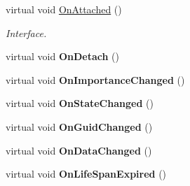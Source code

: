 \begin{DoxyCompactItemize}
virtual void \hyperlink{class_i_thing_afc3be625c06f223c51d76ecc93d91811}{On\+Attached} ()
\begin{DoxyCompactList}\small\item\em Interface. \end{DoxyCompactList}\item 
\mbox{\label{class_i_thing_a9dcb0efb7bf085ad0eac865e2e49d46c}} 
virtual void {\bfseries On\+Detach} ()
\item 
\mbox{\label{class_i_thing_a543632e1e628c81071a47904e80ae842}} 
virtual void {\bfseries On\+Importance\+Changed} ()
\item 
\mbox{\label{class_i_thing_a6a50ab4191f986cb614187bc4094375d}} 
virtual void {\bfseries On\+State\+Changed} ()
\item 
\mbox{\label{class_i_thing_af60bed23bee78b51c9316bebc58ea3dd}} 
virtual void {\bfseries On\+Guid\+Changed} ()
\item 
\mbox{\label{class_i_thing_a4e62b4bda0871ed41704b299ce43af9d}} 
virtual void {\bfseries On\+Data\+Changed} ()
\item 
\mbox{\label{class_i_thing_a739362b9f7bf711af7bab2fcef54115d}} 
virtual void {\bfseries On\+Life\+Span\+Expired} ()
\end{DoxyCompactItemize}
